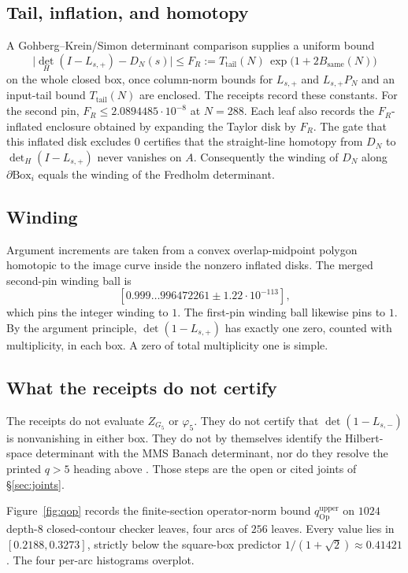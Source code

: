 \documentclass[11pt]{amsart}
\theoremstyle{definition}
\theoremstyle{remark}
\newcommand{\phif}{\varphi_5}
\newcommand{\Zf}{Z_{G_5}}
\newcommand{\detp}{\det(1-L_{s,+})}
\begin{document}
\subsection{Tail, inflation, and homotopy}

A Gohberg--Krein/Simon determinant comparison
\cite[Theorem 4.2]{Simon1977} supplies a uniform bound
\[
\bigl|\det_H(I-L_{s,+})-D_N(s)\bigr|\le F_R
:=T_{\mathrm{tail}}(N)\,\exp\bigl(1+2B_{\mathrm{same}}(N)\bigr)
\]
on the whole closed box, once column-norm bounds for $L_{s,+}$ and
$L_{s,+}P_N$ and an input-tail bound $T_{\mathrm{tail}}(N)$ are
enclosed. The receipts record these constants. For the second pin,
$F_R\le 2.0894485\cdot 10^{-8}$ at $N=288$. Each leaf also records
the $F_R$-inflated enclosure obtained by expanding the Taylor disk
by $F_R$. The gate that this inflated disk excludes $0$ certifies
that the straight-line homotopy from $D_N$ to $\det_H(I-L_{s,+})$
never vanishes on $A$. Consequently the winding of $D_N$ along
$\partial\mathrm{Box}_i$ equals the winding of the Fredholm
determinant.

\subsection{Winding}

Argument increments are taken from a convex overlap-midpoint polygon
homotopic to the image curve inside the nonzero inflated disks.
The merged second-pin winding ball is
\[
[0.999\ldots996472261\pm 1.22\cdot 10^{-113}],
\]
which pins the integer winding to $1$. The first-pin winding ball
likewise pins to $1$. By the argument principle, $\detp$ has
exactly one zero, counted with multiplicity, in each box. A zero of
total multiplicity one is simple.

\subsection{What the receipts do not certify}

The receipts do not evaluate $\Zf$ or $\phif$. They do not certify
that $\det(1-L_{s,-})$ is nonvanishing in either box. They do not
by themselves identify the Hilbert-space determinant with the MMS
Banach determinant, nor do they resolve the printed $q>5$ heading
above \cite[(34)]{MMS2012}. Those steps are the open or cited joints
of \S\ref{sec:joints}.

Figure~\ref{fig:qop} records the finite-section operator-norm bound
$q_{\mathrm{Op}}^{\mathrm{upper}}$ on $1024$ depth-$8$
closed-contour checker leaves, four arcs of $256$ leaves. Every
value lies in $[0.2188,0.3273]$, strictly below the square-box
predictor $1/(1+\sqrt{2})\approx 0.41421$. The four per-arc
histograms overplot.
\end{document}
